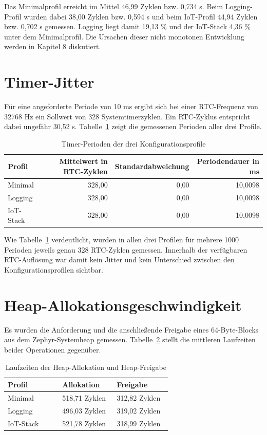 Das Minimalprofil erreicht im Mittel 46,99 Zyklen bzw. 0,734 \textmu{}s. Beim Logging-Profil wurden dabei 38,00 Zyklen bzw. 0,594 \textmu{}s und beim IoT-Profil 44,94 Zyklen bzw. 0,702 \textmu{}s gemessen. Logging liegt damit 19,13 \% und der IoT-Stack 4,36 \% unter dem Minimalprofil. Die Ursachen dieser nicht monotonen Entwicklung werden in Kapitel 8 diskutiert.

\section{Timer-Jitter}
F{\"u}r eine angeforderte Periode von 10 ms ergibt sich bei einer RTC-Frequenz von 32768 Hz ein Sollwert von 328 Systemtimerzyklen. Ein RTC-Zyklus entspricht dabei ungef{\"a}hr 30,52 \textmu{}s. Tabelle~\ref{tab:timer-perioden-profile} zeigt die gemessenen Perioden aller drei Profile.

\begin{table}[H]
\centering
\caption{Timer-Perioden der drei Konfigurationsprofile}
\label{tab:timer-perioden-profile}
\begin{tabular}{lrrr}
\toprule
Profil & Mittelwert in RTC-Zyklen & Standardabweichung & Periodendauer in ms \\
\midrule
Minimal & 328,00 & 0,00 & 10,0098 \\
Logging & 328,00 & 0,00 & 10,0098 \\
IoT-Stack & 328,00 & 0,00 & 10,0098 \\
\bottomrule
\end{tabular}
\end{table}

Wie Tabelle~\ref{tab:timer-perioden-profile} verdeutlicht, wurden in allen drei Profilen f{\"u}r mehrere 1000 Perioden jeweils genau 328 RTC-Zyklen gemessen. Innerhalb der verf{\"u}gbaren RTC-Aufl{\"o}sung war damit kein Jitter und kein Unterschied zwischen den Konfigurationsprofilen sichtbar.

\section{Heap-Allokationsgeschwindigkeit}
Es wurden die Anforderung und die anschlie{\ss}ende Freigabe eines 64-Byte-Blocks aus dem Zephyr-Systemheap gemessen. Tabelle~\ref{tab:heap-laufzeiten} stellt die mittleren Laufzeiten beider Operationen gegen{\"u}ber.

\begin{longtable}{p{0.313\linewidth}p{0.313\linewidth}p{0.313\linewidth}}
\caption{Laufzeiten der Heap-Allokation und Heap-Freigabe}\label{tab:heap-laufzeiten}\\
\toprule
\textbf{Profil} & \textbf{Allokation} & \textbf{Freigabe} \\
\midrule
Minimal & 518,71 Zyklen & 312,82 Zyklen \\
Logging & 496,03 Zyklen & 319,02 Zyklen \\
IoT-Stack & 521,78 Zyklen & 318,99 Zyklen \\
\bottomrule
\end{longtable}

